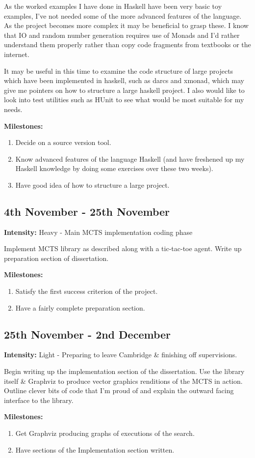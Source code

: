 \documentclass[12pt]{article}
\begin{document}
As the worked examples I have done in Haskell have been very basic toy examples, I've not needed some of the more advanced features of the language. As the project becomes more complex it may be beneficial to grasp these. I know that IO and random number generation requires use of Monads and I'd rather understand them properly rather than copy code fragments from textbooks or the internet.

It may be useful in this time to examine the code structure of large projects which have been implemented in haskell, such as darcs and xmonad, which may give me pointers on how to structure a large haskell project. I also would like to look into test utilities such as HUnit to see what would be most suitable for my needs.
\par
{\bf Milestones:} \begin{enumerate}
\item Decide on a source version tool.
\item {Know advanced features of the language Haskell (and have freshened up my Haskell knowledge by doing some exercises over these two weeks).}
\item Have good idea of how to structure a large project.
\end{enumerate}


\subsection*{4th November - 25th November}
{\bf Intensity:} Heavy - Main MCTS implementation coding phase\par
Implement MCTS library as described along with a tic-tac-toe agent. Write up preparation section of dissertation.\par

{\bf Milestones:} \begin{enumerate}
\item Satisfy the first success criterion of the project.
\item Have a fairly complete preparation section.
\end{enumerate}

\subsection*{25th November - 2nd December}
{\bf Intensity:} Light - Preparing to leave Cambridge \& finishing off supervisions.\par
Begin writing up the implementation section of the dissertation. Use the library itself \& Graphviz to produce vector graphics renditions of the MCTS in action. Outline clever bits of code that I'm proud of and explain the outward facing interface to the library.\par
{\bf Milestones:} \begin{enumerate}
\item Get Graphviz producing graphs of executions of the search.
\item Have sections of the Implementation section written.
\end{enumerate}
\end{document}
